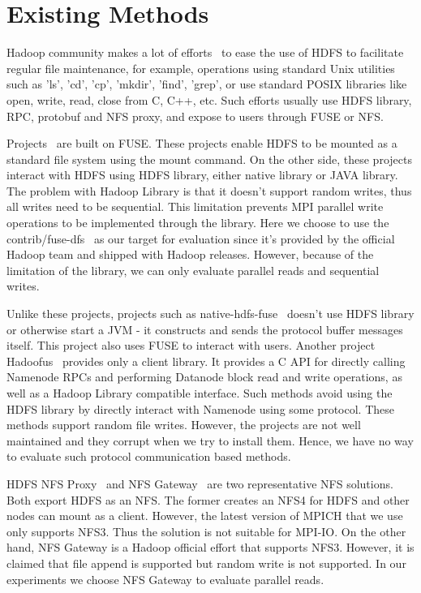 \section{Existing Methods}
\label{sec:bg}
Hadoop community makes a lot of efforts~\cite{fuse} to ease the use of HDFS to
facilitate regular file maintenance, for example, operations using standard Unix
utilities such as 'ls', 'cd', 'cp', 'mkdir', 'find', 'grep', or use standard
POSIX libraries like open, write, read, close from C, C++, etc. Such efforts
usually use HDFS library, RPC, protobuf and NFS proxy, and expose to users
through FUSE or NFS.

Projects~\cite{fuse, hdfs-fuse, fuse-j} are built on FUSE. These projects enable
HDFS to be mounted as a standard file system using the mount command. On the
other side, these projects interact with HDFS using HDFS library, either native
library or JAVA library. The problem with Hadoop Library is that it doesn't
support random writes, thus all writes need to be sequential. This limitation
prevents MPI parallel write operations to be implemented through the library.
Here we choose
to use the contrib/fuse-dfs~\cite{fuse} as our target for evaluation since it's
provided by the official Hadoop team and shipped with Hadoop releases. However,
because of the limitation of the library, we can only evaluate parallel reads and
sequential writes.

Unlike
these projects, projects such as native-hdfs-fuse~\cite{native} doesn't use
HDFS library or otherwise start a JVM - it constructs and sends the protocol buffer
messages itself. This project also uses FUSE to interact with users. Another
project Hadoofus~\cite{hadoofus} provides only a client library. It provides a C
API for directly calling Namenode RPCs and performing Datanode block read and
write operations, as well as a Hadoop Library compatible interface. Such methods
avoid using the HDFS library by directly interact with Namenode using some
protocol. These methods support random file writes. However, the projects are
not well maintained and they corrupt when we try to install them. Hence, we have
no way to evaluate such protocol communication based methods.

HDFS NFS Proxy~\cite{proxy} and NFS Gateway~\cite{nfs} are two representative
NFS solutions. Both export HDFS as an NFS. The former creates an NFS4 for HDFS
and other nodes can mount as a client. However, the latest version of MPICH that
we use only supports NFS3. Thus the solution is not suitable for MPI-IO. On the
other hand, NFS Gateway is a Hadoop official effort that supports NFS3. However,
it is claimed that file append is supported but random write is not supported.
In our experiments we choose NFS Gateway to evaluate parallel reads.
